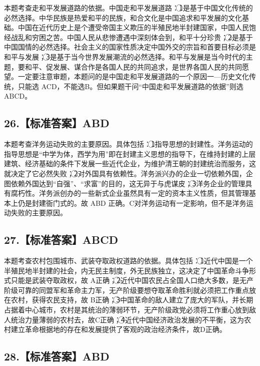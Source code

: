 \documentclass[UTF8,11pt]{ctexart}
\begin{document}
本题考查走和平发展道路的依据。中国走和平发展道路：\textcircled{1}是基于中国文化传统的必然选择。中华民族是热爱和平的民族，和合文化是中国追求和平发展的文化基础。中国在近代历史上是个遭受帝国主义欺压的半殖民地半封建国家，中国人民饱经战乱和穷困之苦。中国人民从悲惨遭遇中深刻体会到，和平十分珍贵；\textcircled{2}是基于中国国情的必然选择。社会主义的国家性质决定中国外交的宗旨和首要目标必须是和平与发展；\textcircled{3}是基于当今世界发展潮流的必然选择。和平与发展是当今时代的主题，要和平、促发展、谋合作是各国人民的共同追求，是世界各国人民的共同愿望。一定要注意审题，本题问的是中国走和平发展道路的一个原因一—历史文化传统，只能选 ACD，不能选B。但如果题干问“中国走和平发展道路的依据”则选 ABCD。


\subsection*{26.【标准答案】ABD}

本题考查洋务运动失败的主要原因。具体包括：\textcircled{1}指导思想的封建性。洋务运动的指导思想是“中学为体，西学为用”即在封建主义思想的指导下，在维持封建的上层建筑、经济基础的条件下发展一些近代企业，为维护清王朝的封建统治而服务，这就决定了它必然失败；\textcircled{2}对外国具有依赖性。洋务派兴办的企业一切依赖外国，企图依赖外国达到“自强”、“求富”的目的，这无异于与虎谋皮；\textcircled{3}洋务企业的管理具有腐朽性。洋务派创办的一些新式企业虽然具有一定的资本主义性质，但其管理基本上仍是封建衙门式的。故 ABD 正确。C对洋务运动有一定影响，但不是洋务运动失败的主要原因。


\subsection*{27.【标准答案】ABCD}

本题考查农村包围城市、武装夺取政权道路的依据。具体包括：\textcircled{1}近代中国是一个半殖民地半封建的社会，内无民主制度，外无民族独立，这决定了中国革命斗争形式只能是武装夺取政权，故 A正确；\textcircled{2}近代中国农民占全国人口绝大多数，是无产阶级可靠的同盟军和革命主力军，无产阶级要想夺取革命胜利就必须把工作重点放在农村，获得农民支持，故 B正确；\textcircled{3}中国革命的敌人建立了庞大的军队，并长期占据着中心城市，农村是其统治的薄弱环节，无产阶级政党必须将工作重心放到敌人统治力量薄弱的农村去，故C正确；\textcircled{4}近代中国经济政治发展的不平衡，这为农村建立革命根据地的存在和发展提供了客观的政治经济条件，故D正确。


\subsection*{28.【标准答案】ABD}
\end{document}
